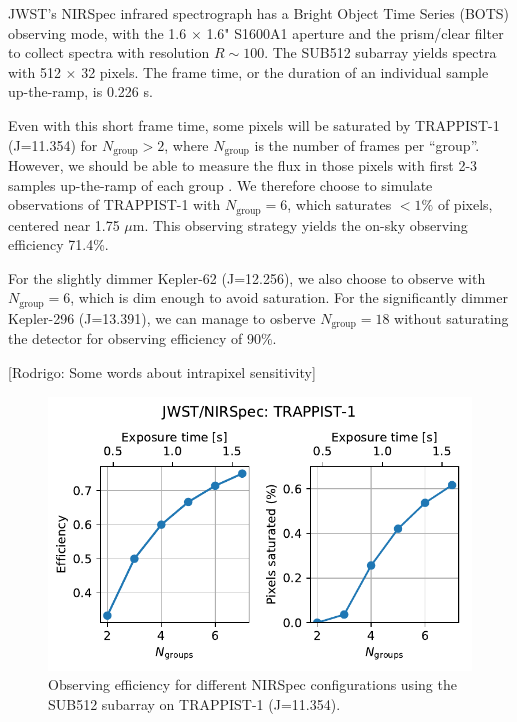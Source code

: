 JWST's NIRSpec infrared spectrograph has a Bright Object Time Series (BOTS) observing mode, with the 1.6 $\times$ 1.6" S1600A1 aperture and the prism/clear filter to collect spectra with resolution $R\sim100$. The SUB512 subarray yields spectra with 512 $\times$ 32 pixels. The frame time, or the duration of an individual sample up-the-ramp, is 0.226 s. 

Even with this short frame time, some pixels will be saturated by TRAPPIST-1 (J=11.354) for $N_\mathrm{group} > 2$, where $N_\mathrm{group}$ is the number of frames per ``group''. However, we should be able to measure the flux in those pixels with first 2-3 samples up-the-ramp of each group \citep[see also][]{Batalha2018}. We therefore choose to simulate observations of TRAPPIST-1 with $N_\mathrm{group} = 6$, which saturates $<1\%$ of pixels, centered near 1.75 $\mu$m. This observing strategy yields the on-sky observing efficiency 71.4\%. 

For the slightly dimmer Kepler-62 (J=12.256), we also choose to observe with $N_\mathrm{group} = 6$, which is dim enough to avoid saturation. For the significantly dimmer Kepler-296 (J=13.391), we can manage to osberve $N_\mathrm{group} = 18$ without saturating the detector for observing efficiency of 90\%.

[Rodrigo: Some words about intrapixel sensitivity] \citep{Luger2016}

\begin{figure}
    \centering
    \includegraphics[scale=0.65]{libra/efficiency.pdf}
    \caption{Observing efficiency for different NIRSpec configurations using the SUB512 subarray on TRAPPIST-1 (J=11.354).}
    \label{fig:efficiency}
\end{figure}


